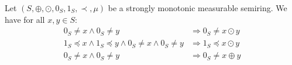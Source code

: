 \begin{proposition}  
    \label{prop_endrullis_2d7}
    Let $(S, \oplus, \odot, 0_S, 1_S, \prec, \mu)$ be a strongly monotonic measurable semiring. We have for all $x,y\in S$:
    \begin{align*}
        0_S \neq x \land 0_S \neq y 
        &\Rightarrow 0_S \neq x \odot y 
        \tag{S10} \label{eq:prop_neq0_mul_neq0}  
        \\
        1_S \preceq x \land 1_S \preceq y \land 0_S \neq x \land 0_S \neq y  
        &\Rightarrow
         1_S \preceq x \odot y 
         \tag{S11} \label{eq:prop_neg0_ge1_mul_ge1}  
         \\
         0_S \neq x \land 0_S \neq y   
         &\Rightarrow 0_S \neq x \oplus y
         \tag{S12} \label{eq:prop_neq0_plus_neq0}  
    \end{align*}
\end{proposition}

